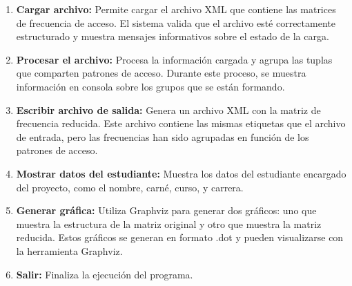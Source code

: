 \documentclass[letterpaper,12pt]{article}
\begin{document}
\begin{multicols}{2}
    \begin{enumerate}
        \item \textbf{Cargar archivo:} Permite cargar el archivo XML que contiene las matrices de frecuencia de acceso. El sistema valida que el archivo esté correctamente estructurado y muestra mensajes informativos sobre el estado de la carga.
        \item \textbf{Procesar el archivo:} Procesa la información cargada y agrupa las tuplas que comparten patrones de acceso. Durante este proceso, se muestra información en consola sobre los grupos que se están formando.
        \item \textbf{Escribir archivo de salida:} Genera un archivo XML con la matriz de frecuencia reducida. Este archivo contiene las mismas etiquetas que el archivo de entrada, pero las frecuencias han sido agrupadas en función de los patrones de acceso.
        \item \textbf{Mostrar datos del estudiante:} Muestra los datos del estudiante encargado del proyecto, como el nombre, carné, curso, y carrera.
        \item \textbf{Generar gráfica:} Utiliza Graphviz para generar dos gráficos: uno que muestra la estructura de la matriz original y otro que muestra la matriz reducida. Estos gráficos se generan en formato .dot y pueden visualizarse con la herramienta Graphviz.
        \item \textbf{Salir:} Finaliza la ejecución del programa.
    \end{enumerate}


\end{multicols}
\end{document}
